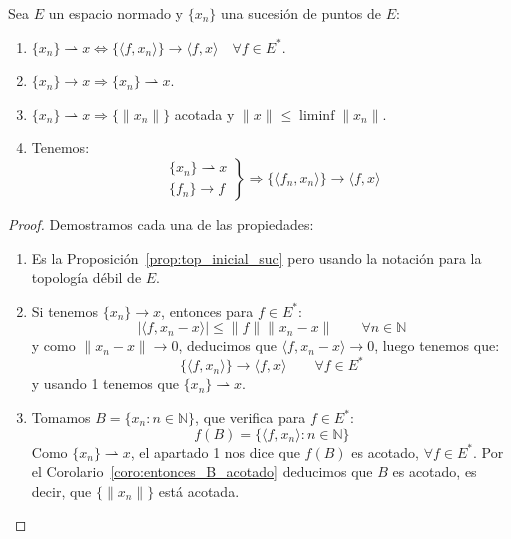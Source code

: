 \begin{prop}
    Sea $E$ un espacio normado y $\{x_n\}$ una sucesión de puntos de $E$:
    \begin{enumerate}
        \item $\{x_n\} \rightharpoonup x \Longleftrightarrow \{\langle f,x_n \rangle \}\to \langle f,x \rangle \quad \forall f\in E^\ast$.
        \item $\{x_n\}\to x \Longrightarrow \{x_n\} \rightharpoonup x$.
        \item $\{x_n\}\rightharpoonup x \Longrightarrow \{\|x_n\|\}$ acotada y $\|x\|\leq \liminf \|x_n\|$.
        \item Tenemos:
            \begin{equation*}
                \left.\begin{array}{r}
                    \{x_n\}\rightharpoonup x \\
                    \{f_n\} \to f
                \end{array}\right\} \Longrightarrow \{\langle f_n,x_n \rangle \}\to \langle f,x \rangle 
            \end{equation*}
    \end{enumerate}
    \begin{proof}
        Demostramos cada una de las propiedades:
        \begin{enumerate}
            \item Es la Proposición~\ref{prop:top_inicial_suc} pero usando la notación para la topología débil de $E$.
            \item Si tenemos $\{x_n\} \to x$, entonces para $f\in E^\ast$:
                \begin{equation*}
                    |\langle f,x_n-x \rangle | \leq \|f\|\|x_n-x\|  \qquad \forall n\in \mathbb{N}
                \end{equation*}
                y como $\|x_n-x\| \to 0$, deducimos que $\langle f,x_n-x \rangle \to 0 $, luego tenemos que:
                \begin{equation*}
                    \{\langle f,x_n \rangle \}\to \langle f,x \rangle  \qquad \forall f\in E^\ast
                \end{equation*}
                y usando 1 tenemos que $\{x_n\}\rightharpoonup x$.
            \item Tomamos $B = \{x_n : n\in \mathbb{N}\}$, que verifica para $f\in E^\ast$:
                \begin{equation*}
                    f(B) = \{\langle f,x_n \rangle : n\in \mathbb{N}\}
                \end{equation*}
                Como $\{x_n\}\rightharpoonup x$, el apartado 1 nos dice que $f(B)$ es acotado, $\forall f\in E^\ast$. Por el Corolario~\ref{coro:entonces_B_acotado} deducimos que $B$ es acotado, es decir, que $\{\|x_n\|\}$ está acotada.


\end{enumerate}
\end{proof}
\end{prop}
